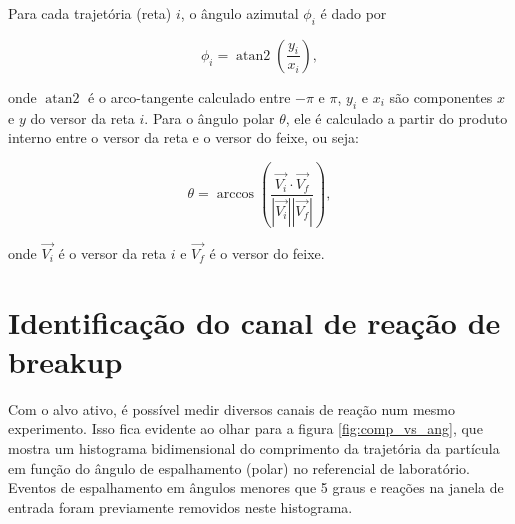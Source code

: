 \documentclass[a4paper,12pt,oneside]{book}
\DeclareMathOperator{\atantwo}{atan2}
\begin{document}
\par Para cada trajetória (reta) $i$, o ângulo azimutal $\phi_i$ é dado por

\begin{equation}
	\phi_i = \atantwo \left (\frac{y_i}{x_i} \right),
\end{equation}

\par onde $\atantwo$ é o arco-tangente calculado entre $-\pi$ e $\pi$, $y_i$ e $x_i$ são componentes $x$ e $y$ do versor da reta $i$. Para o ângulo polar $\theta$, ele é calculado a partir do produto interno entre o versor da reta e o versor do feixe, ou seja:

\begin{equation}
	\theta = \arccos \left (\frac{\vec{V_i} \cdot \vec{V_f}}{|\vec{V_i}| |\vec{V_f}|}  \right),
\end{equation}

\par onde $\vec{V_i}$ é o versor da reta $i$ e $\vec{V_f}$ é o versor do feixe.

\section{Identificação do canal de reação de breakup}

\par Com o alvo ativo, é possível medir diversos canais de reação num mesmo experimento. Isso fica evidente ao olhar para a figura \ref{fig:comp_vs_ang}, que mostra um histograma bidimensional do comprimento da trajetória da partícula em função do ângulo de espalhamento (polar) no referencial de laboratório. Eventos de espalhamento em ângulos menores que 5 graus e reações na janela de entrada foram previamente removidos neste histograma.


%
\end{document}
